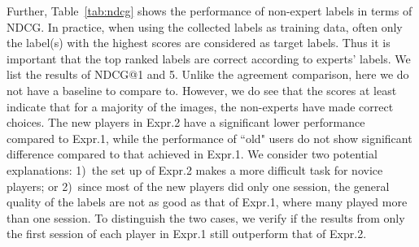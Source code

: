 Further, Table~\ref{tab:ndcg} shows the performance of non-expert labels in terms of NDCG. 
%
In practice, when using the collected labels as training data, often only the label(s) with 
the highest scores are considered as target labels. 
%
Thus it is important that the top ranked labels are correct according
to experts' labels. We list the results of NDCG@1 and 5.  
Unlike the agreement comparison, here we do not 
have a baseline to compare to.  However, we do see that the scores at least
indicate that for a majority of the images, the non-experts have made correct choices. 
%
The new players in Expr.2 have a significant lower performance compared to
Expr.1, while the performance of ``old" users do not show significant difference compared to 
that achieved in Expr.1. 
%
%
We consider two potential explanations: 1)~the set up of Expr.2 makes a more
difficult task for novice players; or 2)~since most of the new players did only one session, the general quality of the labels 
are not as good as that of Expr.1, where many played more than one session. 
To distinguish the two cases, we verify if the results from only the first session of each player in Expr.1 still outperform 
that of Expr.2.
